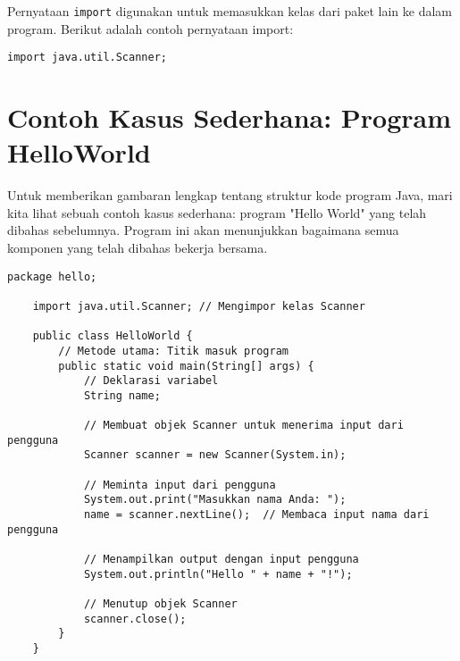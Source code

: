 Pernyataan \texttt{import} digunakan untuk memasukkan kelas dari paket lain ke dalam program. Berikut adalah contoh pernyataan import:

\begin{lstlisting}[style=JavaStyle]
	import java.util.Scanner;
\end{lstlisting}

\section{Contoh Kasus Sederhana: Program HelloWorld}

Untuk memberikan gambaran lengkap tentang struktur kode program Java, mari kita lihat sebuah contoh kasus sederhana: program "Hello World" yang telah dibahas sebelumnya. Program ini akan menunjukkan bagaimana semua komponen yang telah dibahas bekerja bersama.

\begin{lstlisting}[style=JavaStyle, caption={Contoh Program HelloWorld.java}]
	package hello;
	
	import java.util.Scanner; // Mengimpor kelas Scanner
	
	public class HelloWorld {
		// Metode utama: Titik masuk program
		public static void main(String[] args) {
			// Deklarasi variabel
			String name;
			
			// Membuat objek Scanner untuk menerima input dari pengguna
			Scanner scanner = new Scanner(System.in);
			
			// Meminta input dari pengguna
			System.out.print("Masukkan nama Anda: ");
			name = scanner.nextLine();  // Membaca input nama dari pengguna
			
			// Menampilkan output dengan input pengguna
			System.out.println("Hello " + name + "!");
			
			// Menutup objek Scanner
			scanner.close();
		}
	}
\end{lstlisting}


